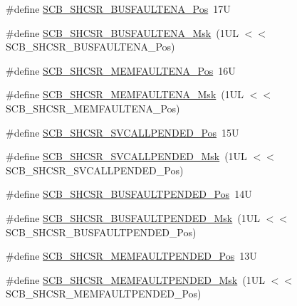 \begin{DoxyCompactItemize}
\item 
\#define \hyperlink{group___c_m_s_i_s___s_c_b_ga3d32edbe4a5c0335f808cfc19ec7e844}{S\+C\+B\+\_\+\+S\+H\+C\+S\+R\+\_\+\+B\+U\+S\+F\+A\+U\+L\+T\+E\+N\+A\+\_\+\+Pos}~17U
\item 
\#define \hyperlink{group___c_m_s_i_s___s_c_b_ga43e8cbe619c9980e0d1aacc85d9b9e47}{S\+C\+B\+\_\+\+S\+H\+C\+S\+R\+\_\+\+B\+U\+S\+F\+A\+U\+L\+T\+E\+N\+A\+\_\+\+Msk}~(1\+U\+L $<$$<$ S\+C\+B\+\_\+\+S\+H\+C\+S\+R\+\_\+\+B\+U\+S\+F\+A\+U\+L\+T\+E\+N\+A\+\_\+\+Pos)
\item 
\#define \hyperlink{group___c_m_s_i_s___s_c_b_ga685b4564a8760b4506f14ec4307b7251}{S\+C\+B\+\_\+\+S\+H\+C\+S\+R\+\_\+\+M\+E\+M\+F\+A\+U\+L\+T\+E\+N\+A\+\_\+\+Pos}~16U
\item 
\#define \hyperlink{group___c_m_s_i_s___s_c_b_gaf084424fa1f69bea36a1c44899d83d17}{S\+C\+B\+\_\+\+S\+H\+C\+S\+R\+\_\+\+M\+E\+M\+F\+A\+U\+L\+T\+E\+N\+A\+\_\+\+Msk}~(1\+U\+L $<$$<$ S\+C\+B\+\_\+\+S\+H\+C\+S\+R\+\_\+\+M\+E\+M\+F\+A\+U\+L\+T\+E\+N\+A\+\_\+\+Pos)
\item 
\#define \hyperlink{group___c_m_s_i_s___s_c_b_ga2f93ec9b243f94cdd3e94b8f0bf43641}{S\+C\+B\+\_\+\+S\+H\+C\+S\+R\+\_\+\+S\+V\+C\+A\+L\+L\+P\+E\+N\+D\+E\+D\+\_\+\+Pos}~15U
\item 
\#define \hyperlink{group___c_m_s_i_s___s_c_b_ga6095a7acfbad66f52822b1392be88652}{S\+C\+B\+\_\+\+S\+H\+C\+S\+R\+\_\+\+S\+V\+C\+A\+L\+L\+P\+E\+N\+D\+E\+D\+\_\+\+Msk}~(1\+U\+L $<$$<$ S\+C\+B\+\_\+\+S\+H\+C\+S\+R\+\_\+\+S\+V\+C\+A\+L\+L\+P\+E\+N\+D\+E\+D\+\_\+\+Pos)
\item 
\#define \hyperlink{group___c_m_s_i_s___s_c_b_gaa22551e24a72b65f1e817f7ab462203b}{S\+C\+B\+\_\+\+S\+H\+C\+S\+R\+\_\+\+B\+U\+S\+F\+A\+U\+L\+T\+P\+E\+N\+D\+E\+D\+\_\+\+Pos}~14U
\item 
\#define \hyperlink{group___c_m_s_i_s___s_c_b_ga677c23749c4d348f30fb471d1223e783}{S\+C\+B\+\_\+\+S\+H\+C\+S\+R\+\_\+\+B\+U\+S\+F\+A\+U\+L\+T\+P\+E\+N\+D\+E\+D\+\_\+\+Msk}~(1\+U\+L $<$$<$ S\+C\+B\+\_\+\+S\+H\+C\+S\+R\+\_\+\+B\+U\+S\+F\+A\+U\+L\+T\+P\+E\+N\+D\+E\+D\+\_\+\+Pos)
\item 
\#define \hyperlink{group___c_m_s_i_s___s_c_b_gaceb60fe2d8a8cb17fcd1c1f6b5aa924f}{S\+C\+B\+\_\+\+S\+H\+C\+S\+R\+\_\+\+M\+E\+M\+F\+A\+U\+L\+T\+P\+E\+N\+D\+E\+D\+\_\+\+Pos}~13U
\item 
\#define \hyperlink{group___c_m_s_i_s___s_c_b_ga9abc6c2e395f9e5af4ce05fc420fb04c}{S\+C\+B\+\_\+\+S\+H\+C\+S\+R\+\_\+\+M\+E\+M\+F\+A\+U\+L\+T\+P\+E\+N\+D\+E\+D\+\_\+\+Msk}~(1\+U\+L $<$$<$ S\+C\+B\+\_\+\+S\+H\+C\+S\+R\+\_\+\+M\+E\+M\+F\+A\+U\+L\+T\+P\+E\+N\+D\+E\+D\+\_\+\+Pos)
$$
\end{DoxyCompactItemize}

